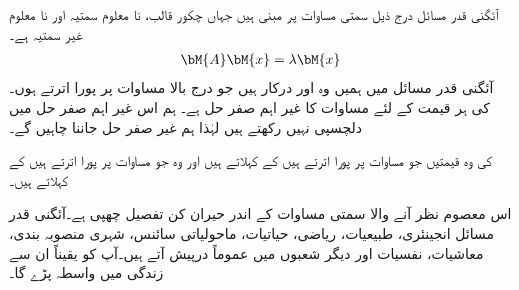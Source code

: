 آئگنی قدر مسائل درج ذیل سمتی مساوات پر مبنی ہیں جہاں  چکور قالب،  نا معلوم سمتیہ اور  نا معلوم غیر سمتیہ ہے۔
\begin{align}\label{مساوات_آئگنی_مسئلہ_الف}
\bM{A}\bM{x}=\lambda \bM{x}
\end{align}
آئگنی قدر مسائل میں ہمیں وہ  اور  درکار ہیں جو درج بالا مساوات پر پورا اترتے ہوں۔  کی ہر قیمت کے لئے 
  مساوات  کا غیر اہم صفر حل ہے۔ ہم اس غیر اہم صفر حل میں دلچسپی نہیں رکھتے ہیں لہٰذا ہم غیر صفر حل  جاننا چاہیں گے۔

 کی وہ قیمتیں جو مساوات  پر پورا اترتے ہیں  کے  کہلاتے ہیں اور وہ  جو مساوات  پر پورا اترتے ہیں  کے  کہلاتے ہیں۔

اس معصوم نظر آنے والا سمتی مساوات کے اندر حیران کن تفصیل چھپی ہے۔آئگنی قدر مسائل انجینئری، طبیعیات، ریاضی، حیاتیات، ماحولیاتی سائنس، شہری منصوبہ بندی،  معاشیات، نفسیات اور دیگر شعبوں میں عموماً درپیش آتے ہیں۔آپ کو یقیناً ان سے زندگی میں واسطہ پڑے گا۔

